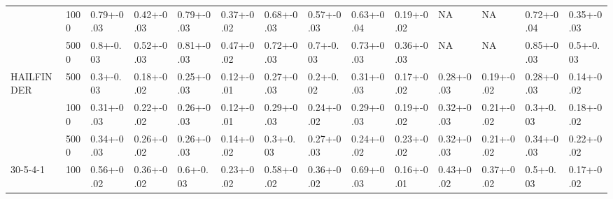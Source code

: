 \begin{landscape}
\begin{center}
{\begin{tabular}{llllllllllllll}
           & 1000    & 0.79+-0.03                    & 0.42+-0.03                 & 0.79+-0.03                    & 0.37+-0.02                 & 0.68+-0.03                    & 0.57+-0.03                 & 0.63+-0.04                            & 0.19+-0.02                         & NA                            & NA                         & 0.72+-0.04                    & 0.35+-0.03                 \\
           & 5000    & 0.8+-0.03                     & 0.52+-0.03                 & 0.81+-0.03                    & 0.47+-0.02                 & 0.72+-0.03                    & 0.7+-0.03                  & 0.73+-0.03                            & 0.36+-0.03                         & NA                            & NA                         & 0.85+-0.03                    & 0.5+-0.03                  \\ \hline
HAILFINDER & 500     & 0.3+-0.03                     & 0.18+-0.02                 & 0.25+-0.03                    & 0.12+-0.01                 & 0.27+-0.03                    & 0.2+-0.02                  & 0.31+-0.03                            & 0.17+-0.02                         & 0.28+-0.03                            & 0.19+-0.02                         & 0.28+-0.03                    & 0.14+-0.02                 \\
           & 1000    & 0.31+-0.03                    & 0.22+-0.02                 & 0.26+-0.03                    & 0.12+-0.01                 & 0.29+-0.03                    & 0.24+-0.02                 & 0.29+-0.03                            & 0.19+-0.02                         & 0.32+-0.03                            & 0.21+-0.02                         & 0.3+-0.03                     & 0.18+-0.02                 \\
           & 5000    & 0.34+-0.03                    & 0.26+-0.02                 & 0.26+-0.03                    & 0.14+-0.02                 & 0.3+-0.03                     & 0.27+-0.03                 & 0.24+-0.02                            & 0.23+-0.02                         & 0.32+-0.03                            & 0.21+-0.02                         & 0.34+-0.03                    & 0.22+-0.02                 \\ \hline
30-5-4-1   & 100     & 0.56+-0.02                    & 0.36+-0.02                 & 0.6+-0.03                     & 0.23+-0.02                 & 0.58+-0.02                    & 0.36+-0.02                 & 0.69+-0.03                    & 0.16+-0.01                 & 0.43+-0.02                    & 0.37+-0.02                 & 0.5+-0.03                     & 0.17+-0.02                 \\

\end{tabular}}
\end{center}
\end{landscape}
